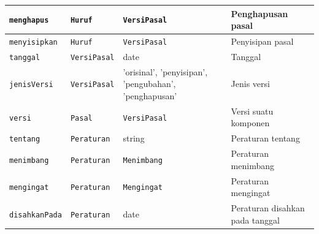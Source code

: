 \begin{longtable}{|p{}|p{}|p{}|p{}|}
  \texttt{menghapus}       & \texttt{Huruf}                                                                                                      & \texttt{VersiPasal}                                   & Penghapusan pasal                                 \\ \hline
  \texttt{menyisipkan}     & \texttt{Huruf}                                                                                                      & \texttt{VersiPasal}                                   & Penyisipan pasal                                  \\ \hline
  \texttt{tanggal}         & \texttt{VersiPasal}                                                                                                 & date                                                  & Tanggal                                           \\ \hline
  \texttt{jenisVersi}      & \texttt{VersiPasal}                                                                                                 & 'orisinal', 'penyisipan', 'pengubahan', 'penghapusan' & Jenis versi                                       \\ \hline
  \texttt{versi}           & \texttt{Pasal}                                                                                                      & \texttt{VersiPasal}                                   & Versi suatu komponen                              \\ \hline
  \texttt{tentang}         & \texttt{Peraturan}                                                                                                  & string                                                & Peraturan tentang                                 \\ \hline
  \texttt{menimbang}       & \texttt{Peraturan}                                                                                                  & \texttt{Menimbang}                                    & Peraturan menimbang                               \\ \hline
  \texttt{mengingat}       & \texttt{Peraturan}                                                                                                  & \texttt{Mengingat}                                    & Peraturan mengingat                               \\ \hline
  \texttt{disahkanPada}    & \texttt{Peraturan}                                                                                                  & date                                                  & Peraturan disahkan pada tanggal                   \\ \hline

\end{longtable}
